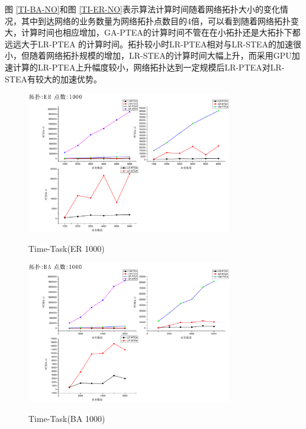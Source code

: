图 \ref{TI-BA-NO}和图 \ref{TI-ER-NO}表示算法计算时间随着网络拓扑大小的变化情况，其中到达网络的业务数量为网络拓扑点数目的4倍，可以看到随着网络拓扑变大，计算时间也相应增加，GA-PTEA的计算时间不管在在小拓扑还是大拓扑下都远远大于LR-PTEA 的计算时间。拓扑较小时LR-PTEA相对与LR-STEA的加速很小，但随着网络拓扑规模的增加，LR-STEA的计算时间大幅上升，而采用GPU加速计算的LR-PTEA上升幅度较小，网络拓扑达到一定规模后LR-PTEA对LR-STEA有较大的加速优势。
\begin{figure}
\setlength{\belowcaptionskip}{-0.1cm}
\begin{center}
{\includegraphics[width=0.8\textwidth]{figures/TI-ER-TA-1000.pdf}}
\end{center}
\caption{{\footnotesize{Time-Task(ER 1000)}}}
\label{TI-ER-TA-1000}
\end{figure}
\begin{figure}
\setlength{\belowcaptionskip}{-0.1cm}
\begin{center}
{\includegraphics[width=0.8\textwidth]{figures/TI-BA-TA-1000.pdf}}
\end{center}
\caption{{\footnotesize{Time-Task(BA 1000)}}}
\label{TI-BA-TA-1000}
\end{figure}
